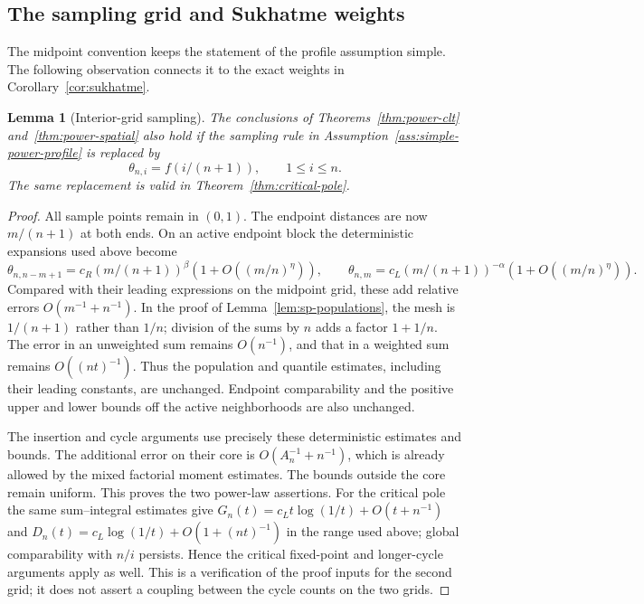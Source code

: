 \documentclass[11pt]{article}
\newtheorem{lemma}[theorem]{Lemma}
\theoremstyle{remark}
\theoremstyle{plain}
\begin{document}
\subsection{The sampling grid and Sukhatme weights}

The midpoint convention keeps the statement of the profile assumption
simple.  The following observation connects it to the exact weights in
Corollary~\ref{cor:sukhatme}.

\begin{lemma}[Interior-grid sampling]\label{lem:sp-interior-grid}
The conclusions of Theorems~\ref{thm:power-clt}
and~\ref{thm:power-spatial} also hold if the sampling rule in
Assumption~\ref{ass:simple-power-profile} is replaced by
\[
 \theta_{n,i}=f(i/(n+1)),\qquad 1\le i\le n.
\]
The same replacement is valid in Theorem~\ref{thm:critical-pole}.
\end{lemma}

\begin{proof}
All sample points remain in $(0,1)$.  The endpoint distances are now
$m/(n+1)$ at both ends.  On an active endpoint block the deterministic
expansions used above become
\[
 \theta_{n,n-m+1}
 =c_R(m/(n+1))^\beta(1+O((m/n)^\eta)),\qquad
 \theta_{n,m}
 =c_L(m/(n+1))^{-\alpha}(1+O((m/n)^\eta)).
\]
Compared with their leading expressions on the midpoint grid, these
add relative errors $O(m^{-1}+n^{-1})$.  In the proof of
Lemma~\ref{lem:sp-populations}, the mesh is $1/(n+1)$ rather than $1/n$;
division of the sums by $n$ adds a factor $1+1/n$.  The error in an
unweighted sum remains $O(n^{-1})$, and that in a weighted sum remains
$O((nt)^{-1})$.  Thus the population and quantile estimates, including
their leading constants, are unchanged.  Endpoint comparability and
the positive upper and lower bounds off the active neighborhoods are
also unchanged.

The insertion and cycle arguments use precisely these deterministic
estimates and bounds.  The additional error on their core is
$O(A_n^{-1}+n^{-1})$, which is already allowed by the mixed factorial
moment estimates.  The bounds outside the core remain uniform.
This proves the two power-law assertions.  For the critical pole the
same sum--integral estimates give $G_n(t)=c_Lt\log(1/t)+O(t+n^{-1})$
and $D_n(t)=c_L\log(1/t)+O(1+(nt)^{-1})$ in the range used above;
global comparability with $n/i$ persists.  Hence the critical
fixed-point and longer-cycle arguments apply as well.
This is a verification of the proof inputs for the second grid; it
does not assert a coupling between the cycle counts on the two grids.
\end{proof}
\end{document}
